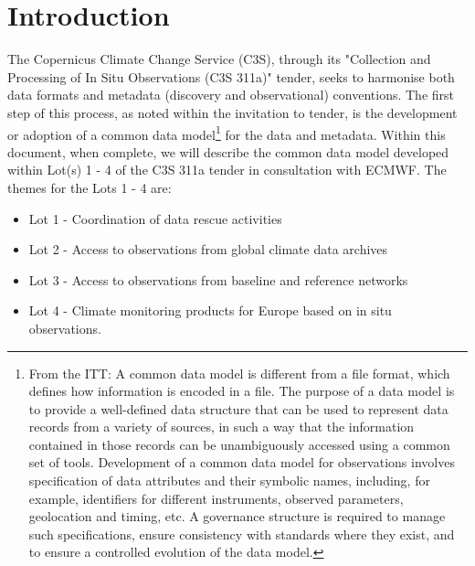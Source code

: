\documentclass[a4paper]{article}
\begin{document}
\newpage
\tableofcontents
\newpage
\listoftables
\newpage


\section {Introduction}

The Copernicus Climate Change Service (C3S), through its "Collection and Processing of In Situ Observations (C3S 311a)" tender, seeks to harmonise both data formats and metadata (discovery and observational) conventions. The first step of this process, as noted within the invitation to tender, is the development or adoption of a common data model\footnote{From the ITT: A common data model is different from a file format, which defines how information is encoded in a file. The purpose of a data model is to provide a well-defined data structure that can be used to represent data records from a variety of sources, in such a way that the information contained in those records can be unambiguously accessed using a common set of tools. Development of a common data model for observations involves specification of data attributes and their symbolic names, including, for example, identifiers for different instruments, observed parameters, geolocation and timing, etc. A governance structure is required to manage such specifications, ensure consistency with standards where they exist, and to ensure a controlled evolution of the data model.} for the data and metadata. Within this document, when complete, we will describe the common data model developed within Lot(s) 1 - 4 of the C3S 311a tender in consultation with ECMWF. The themes for the Lots 1 - 4 are:\\
\begin{itemize}
\item Lot 1 - Coordination of data rescue activities
\item Lot 2 - Access to observations from global climate data archives
\item Lot 3 - Access to observations from baseline and reference networks
\item Lot 4 - Climate monitoring products for Europe based on in situ observations.
\end{itemize}
\end{document}
